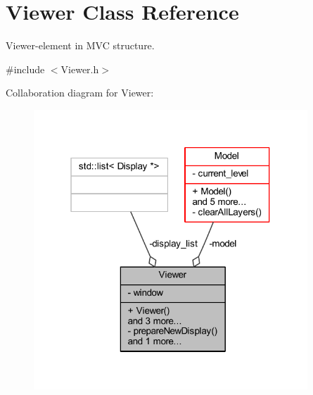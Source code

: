 \hypertarget{class_viewer}{}\section{Viewer Class Reference}
\label{class_viewer}


Viewer-\/element in M\+VC structure.  




{\ttfamily \#include $<$Viewer.\+h$>$}



Collaboration diagram for Viewer\+:
\nopagebreak
\begin{figure}[H]
\begin{center}
\leavevmode
\includegraphics[width=292pt]{class_viewer__coll__graph}
\end{center}
\end{figure}
